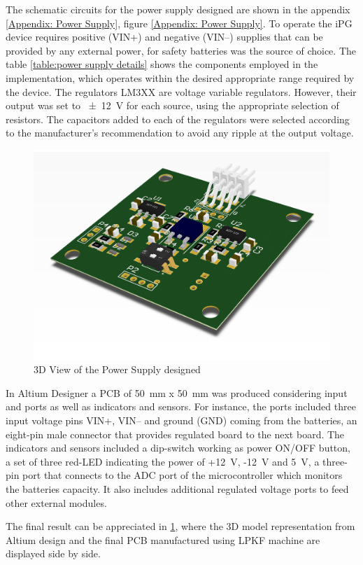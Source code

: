 The schematic circuits for the power supply designed are shown in the appendix \ref{Appendix: Power Supply}, figure \ref{Appendix: Power Supply}. To operate the iPG device requires positive (VIN+) and negative (VIN–) supplies that can be provided by any external power, for safety batteries was the source of choice. The table \ref{table:power supply details} shows the components employed in the implementation, which operates within the desired appropriate range required by the device. The regulators LM3XX are voltage variable regulators. However, their output was set to \SI{\pm 12}{\volt} for each source, using the appropriate selection of resistors. The capacitors added to each of the regulators were selected according to the manufacturer’s recommendation to avoid any ripple at the output voltage.

\begin{figure}[!htpb]
	\centering
	\includegraphics[width=7.5 cm,keepaspectratio]{figure_PS}
	\caption{3D View of the Power Supply designed}
	\label{fig:3D PS}
\end{figure}

In Altium Designer a PCB of \SI{50}{\milli\meter} x \SI{50}{\milli\meter} was produced considering input and ports as well as indicators and sensors. For instance, the ports included three input voltage pins VIN+, VIN– and ground (GND) coming from the batteries, an eight-pin male connector that provides regulated board to the next board. The indicators and sensors included a dip-switch working as power ON/OFF button, a set of three red-LED indicating the power of +\SI{12}{\volt}, -\SI{12}{\volt} and \SI{5}{\volt}, a three-pin port that connects to the ADC port of the microcontroller which monitors the batteries capacity. It also includes additional regulated voltage ports to feed other external modules.

The final result can be appreciated in \ref{fig:3D PS}, where the 3D model representation from Altium design and the final PCB manufactured using LPKF machine are displayed side by side. 



